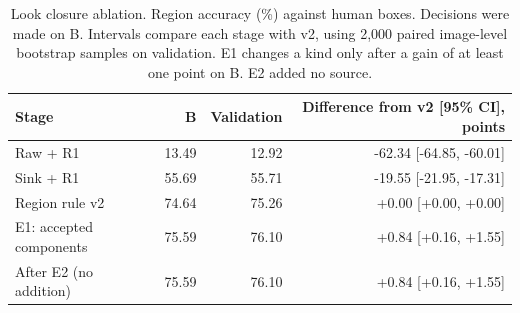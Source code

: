 \begin{table}[t]
\caption{Look closure ablation. Region accuracy (\%) against human boxes. Decisions were made on B.
Intervals compare each stage with v2, using 2,000 paired image-level bootstrap samples on validation.
E1 changes a kind only after a gain of at least one point on B. E2 added no source.}
\label{tab:look-close}
\centering\footnotesize
\begin{tabular}{@{}lrrr@{}}
\toprule
Stage & B & Validation & Difference from v2 [95\% CI], points \\
\midrule
Raw + R1 & 13.49 & 12.92 & -62.34 [-64.85, -60.01] \\
Sink + R1 & 55.69 & 55.71 & -19.55 [-21.95, -17.31] \\
Region rule v2 & 74.64 & 75.26 & +0.00 [+0.00, +0.00] \\
E1: accepted components & 75.59 & 76.10 & +0.84 [+0.16, +1.55] \\
After E2 (no addition) & 75.59 & 76.10 & +0.84 [+0.16, +1.55] \\
\bottomrule\end{tabular}
\end{table}
